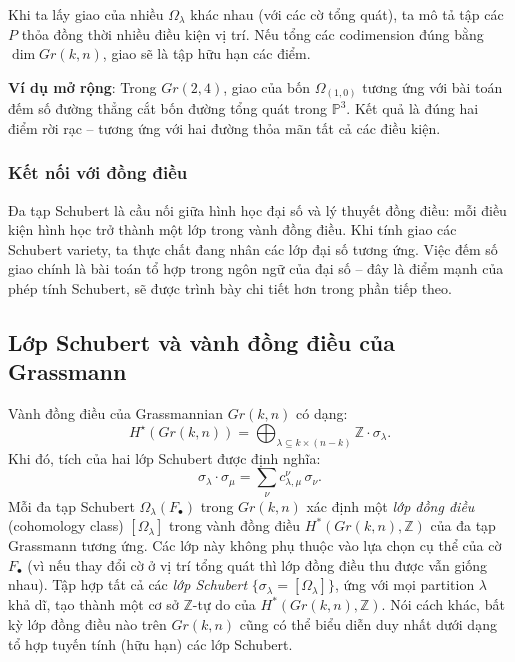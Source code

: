 Khi ta lấy giao của nhiều $\Omega_\lambda$ khác nhau (với các cờ tổng quát), ta mô tả tập các $P$ thỏa đồng thời nhiều điều kiện vị trí. Nếu tổng các codimension đúng bằng $\dim Gr(k,n)$, giao sẽ là tập hữu hạn các điểm.

\textbf{Ví dụ mở rộng}: Trong $Gr(2,4)$, giao của bốn $\Omega_{(1,0)}$ tương ứng với bài toán đếm số đường thẳng cắt bốn đường tổng quát trong $\mathbb{P}^3$. Kết quả là đúng hai điểm rời rạc – tương ứng với hai đường thỏa mãn tất cả các điều kiện.

\subsubsection{\textbf{Kết nối với đồng điều}}
Đa tạp Schubert là cầu nối giữa hình học đại số và lý thuyết đồng điều: mỗi điều kiện hình học trở thành một lớp trong vành đồng điều. Khi tính giao các Schubert variety, ta thực chất đang nhân các lớp đại số tương ứng. Việc đếm số giao chính là bài toán tổ hợp trong ngôn ngữ của đại số – đây là điểm mạnh của phép tính Schubert, sẽ được trình bày chi tiết hơn trong phần tiếp theo.



\subsection{Lớp Schubert và vành đồng điều của Grassmann}
Vành đồng điều của Grassmannian $Gr(k,n)$ có dạng:
$$
H^\star(Gr(k,n)) = \bigoplus_{\lambda \subseteq k \times (n-k)} \mathbb{Z} \cdot \sigma_\lambda.
$$
Khi đó, tích của hai lớp Schubert được định nghĩa:
$$
\sigma_{\lambda} \cdot \sigma_{\mu} = \sum_{\nu} c_{\lambda, \mu}^{\nu} \, \sigma_{\nu}.
$$
Mỗi đa tạp Schubert $\Omega_\lambda(F_\bullet)$ trong $Gr(k,n)$ xác định một \textit{lớp đồng điều} (cohomology class) $[\Omega_\lambda]$ trong vành đồng điều $H^*(Gr(k,n), \mathbb{Z})$ của đa tạp Grassmann tương ứng. Các lớp này không phụ thuộc vào lựa chọn cụ thể của cờ $F_\bullet$ (vì nếu thay đổi cờ ở vị trí tổng quát thì lớp đồng điều thu được vẫn giống nhau). Tập hợp tất cả các \textit{lớp Schubert} $\{\sigma_\lambda = [\Omega_\lambda]\}$, ứng với mọi partition $\lambda$ khả dĩ, tạo thành một cơ sở $\mathbb{Z}$-tự do của $H^*(Gr(k,n),\mathbb{Z})$. Nói cách khác, bất kỳ lớp đồng điều nào trên $Gr(k,n)$ cũng có thể biểu diễn duy nhất dưới dạng tổ hợp tuyến tính (hữu hạn) các lớp Schubert.

